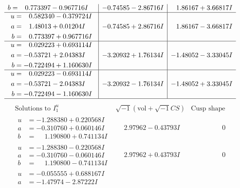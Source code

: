 \documentclass[1p]{elsarticle_modified}
\theoremstyle{definition}
\newcommand{\I}{\sqrt{-1}}
\begin{document}
$$\begin{array}{c|c|c}
\begin{aligned}
b &= \phantom{-}0.773397 - 0.967716 I\end{aligned}
 & -0.74585 - 2.86716 I & \phantom{-}1.86167 + 3.66817 I \\ \hline\begin{aligned}
u &= \phantom{-}0.582340 - 0.379724 I \\
a &= \phantom{-}1.48013 + 0.01204 I \\
b &= \phantom{-}0.773397 + 0.967716 I\end{aligned}
 & -0.74585 + 2.86716 I & \phantom{-}1.86167 - 3.66817 I \\ \hline\begin{aligned}
u &= \phantom{-}0.029223 + 0.693114 I \\
a &= -0.53721 + 2.04383 I \\
b &= -0.722494 + 1.160630 I\end{aligned}
 & -3.20932 + 1.76134 I & -1.48052 - 3.33045 I \\ \hline\begin{aligned}
u &= \phantom{-}0.029223 - 0.693114 I \\
a &= -0.53721 - 2.04383 I \\
b &= -0.722494 - 1.160630 I\end{aligned}
 & -3.20932 - 1.76134 I & -1.48052 + 3.33045 I\\
 \hline 
 \end{array}$$\newpage$$\begin{array}{c|c|c}  
\text{Solutions to }I^u_{1}& \I (\text{vol} + \sqrt{-1}CS) & \text{Cusp shape}\\
 \hline 
\begin{aligned}
u &= -1.288380 + 0.220568 I \\
a &= -0.310760 + 0.060146 I \\
b &= \phantom{-}1.190800 + 0.741134 I\end{aligned}
 & \phantom{-}2.97962 - 0.43793 I & \phantom{-0.000000 } 0 \\ \hline\begin{aligned}
u &= -1.288380 - 0.220568 I \\
a &= -0.310760 - 0.060146 I \\
b &= \phantom{-}1.190800 - 0.741134 I\end{aligned}
 & \phantom{-}2.97962 + 0.43793 I & \phantom{-0.000000 } 0 \\ \hline\begin{aligned}
u &= -0.055555 + 0.688167 I \\
a &= -1.47974 - 2.87222 I \\

\end{aligned}
\end{array}$$
\end{document}
